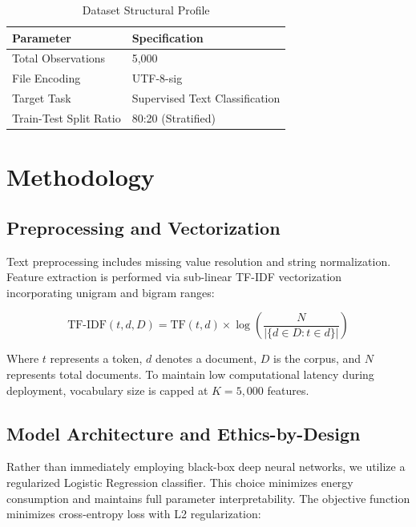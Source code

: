 \documentclass[11pt,a4paper]{article}
\begin{document}
\begin{table}[H]
\centering
\caption{Dataset Structural Profile}
\label{tab:dataset_summary}
\begin{tabular}{ll}
\toprule
\textbf{Parameter} & \textbf{Specification} \\ 
\midrule
Total Observations & 5,000 \\
File Encoding & UTF-8-sig \\
Target Task & Supervised Text Classification \\
Train-Test Split Ratio & 80:20 (Stratified) \\
\bottomrule
\end{tabular}
\end{table}

\section{Methodology}

\subsection{Preprocessing and Vectorization}
Text preprocessing includes missing value resolution and string normalization. Feature extraction is performed via sub-linear TF-IDF vectorization incorporating unigram and bigram ranges:

\begin{equation}
\text{TF-IDF}(t, d, D) = \text{TF}(t, d) \times \log\left(\frac{N}{|\{d \in D : t \in d\}|}\right)
\end{equation}

Where $t$ represents a token, $d$ denotes a document, $D$ is the corpus, and $N$ represents total documents. To maintain low computational latency during deployment, vocabulary size is capped at $K=5,000$ features.

\subsection{Model Architecture and Ethics-by-Design}
Rather than immediately employing black-box deep neural networks, we utilize a regularized Logistic Regression classifier. This choice minimizes energy consumption and maintains full parameter interpretability. The objective function minimizes cross-entropy loss with L2 regularization:
\end{document}
